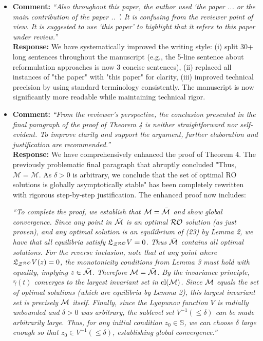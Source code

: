 \documentclass[journal,twoside,web]{ieeecolor}
\begin{document}
\begin{itemize}
\item  \textbf{Comment:} \textit{``Also throughout this paper, the author used `the paper ... or the main contribution of the paper .. '. It is confusing from the reviewer point of view. It is suggested to use `this paper' to highlight that it refers to this paper under review.''}\\

\textbf{Response:} We have systematically improved the writing style: (i) split 30+ long sentences throughout the manuscript (e.g., the 5-line sentence about reformulation approaches is now 3 concise sentences), (ii) replaced all instances of "the paper" with "this paper" for clarity, (iii) improved technical precision by using standard terminology consistently. The manuscript is now significantly more readable while maintaining technical rigor.\\

\item  \textbf{Comment:} \textit{``From the reviewer's perspective, the conclusion presented in the final paragraph of the proof of Theorem 4 is neither straightforward nor self-evident. To improve clarity and support the argument, further elaboration and justification are recommended.''}\\ 

\textbf{Response:} We have comprehensively enhanced the proof of Theorem 4. The previously problematic final paragraph that abruptly concluded "Thus, $\mathcal{M} = \bar{\mathcal{M}}$. As $\delta > 0$ is arbitrary, we conclude that the set of optimal RO solutions is globally asymptotically stable" has been completely rewritten with rigorous step-by-step justification. The enhanced proof now includes:

{\color{revisionblue}\textit{``To complete the proof, we establish that ${\cal M} = \bar{\cal M}$ and show global convergence. Since any point in $\bar{\cal M}$ is an optimal ${\cal RO}$ solution (as just proven), and any optimal solution is an equilibrium of (23) by Lemma 2, we have that all equilibria satisfy $\mathfrak{L}_{{\cal Z}^{\cal RO}}V = 0$. Thus $\bar{\cal M}$ contains all optimal solutions. For the reverse inclusion, note that at any point where $\mathfrak{L}_{{\cal Z}^{\cal RO}}V(z) = 0$, the monotonicity conditions from Lemma 3 must hold with equality, implying $z \in \bar{\cal M}$. Therefore ${\cal M} = \bar{\cal M}$. By the invariance principle, $\bar \gamma(t)$ converges to the largest invariant set in $\text{cl}({\cal M})$. Since ${\cal M}$ equals the set of optimal solutions (which are equilibria by Lemma 2), this largest invariant set is precisely ${\cal M}$ itself. Finally, since the Lyapunov function $V$ is radially unbounded and $\delta > 0$ was arbitrary, the sublevel set $V^{-1}(\leq \delta)$ can be made arbitrarily large. Thus, for any initial condition $z_0 \in \mathbb S$, we can choose $\delta$ large enough so that $z_0 \in V^{-1}(\leq \delta)$, establishing global convergence.''}}


\end{itemize}
\end{document}
